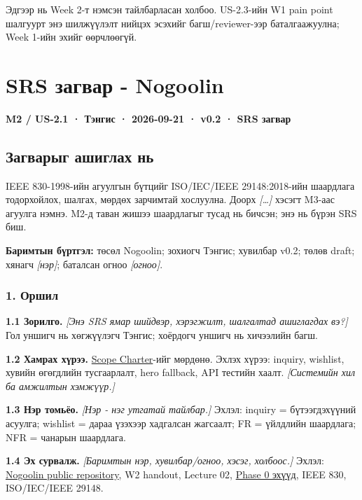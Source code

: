 \documentclass[
  11pt,
  a4paper,
]{article}
\begin{document}
Эдгээр нь Week 2-т нэмсэн тайлбарласан холбоо. US-2.3-ийн W1 pain point
шалгуурт энэ шилжүүлэлт нийцэх эсэхийг багш/reviewer-ээр баталгаажуулна;
Week 1-ийн эхийг өөрчлөөгүй.

\clearpage
\section{SRS загвар -
Nogoolin}\label{doc3-srs-ux437ux430ux433ux432ux430ux440---nogoolin}

\textbf{M2 / US-2.1 · Тэнгис · 2026-09-21 · v0.2 · SRS загвар}

\subsection{Загварыг ашиглах
нь}\label{doc3-ux437ux430ux433ux432ux430ux440ux44bux433-ux430ux448ux438ux433ux43bux430ux445-ux43dux44c}

IEEE 830-1998-ийн агуулгын бүтцийг ISO/IEC/IEEE 29148:2018-ийн шаардлага
тодорхойлох, шалгах, мөрдөх зарчимтай хослуулна. Доорх
\emph{{[}\ldots{]}} хэсэгт M3-аас агуулга нэмнэ. M2-д таван жишээ
шаардлагыг тусад нь бичсэн; энэ нь бүрэн SRS биш.

\textbf{Баримтын бүртгэл:} төсөл Nogoolin; зохиогч Тэнгис; хувилбар
v0.2; төлөв draft; хянагч \emph{{[}нэр{]}}; баталсан огноо
\emph{{[}огноо{]}}.

\subsubsection{1. Оршил}\label{doc3-ux43eux440ux448ux438ux43b}

\textbf{1.1 Зорилго.} \emph{{[}Энэ SRS ямар шийдвэр, хэрэгжилт,
шалгалтад ашиглагдах вэ?{]}} Гол уншигч нь хөгжүүлэгч Тэнгис; хоёрдогч
уншигч нь хичээлийн багш.

\textbf{1.2 Хамрах хүрээ.}
\href{../../requirements/scope-charter.md}{Scope Charter}-ийг мөрдөнө.
Эхлэх хүрээ: inquiry, wishlist, хувийн өгөгдлийн тусгаарлалт, hero
fallback, API тестийн хаалт. \emph{{[}Системийн хил ба амжилтын
хэмжүүр.{]}}

\textbf{1.3 Нэр томьёо.} \emph{{[}Нэр - нэг утгатай тайлбар.{]}} Эхлэл:
inquiry = бүтээгдэхүүний асуулга; wishlist = дараа үзэхээр хадгалсан
жагсаалт; FR = үйлдлийн шаардлага; NFR = чанарын шаардлага.

\textbf{1.4 Эх сурвалж.} \emph{{[}Баримтын нэр, хувилбар/огноо, хэсэг,
холбоос.{]}} Эхлэл: \href{https://github.com/Tengis01/Nogoolin}{Nogoolin
public repository}, W2 handout, Lecture 02,
\href{../../phase-0/README.md}{Phase 0 эхүүд}, IEEE 830, ISO/IEC/IEEE
29148.
\end{document}
